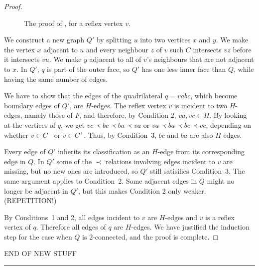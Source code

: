 \begin{proof}
  \begin{figure}
     \caption{The proof of , for a reflex
       vertex $v$.}
  \end{figure}
   


   We construct a new graph $Q'$ by splitting $u$ into two vertices $x$
   and $y$.  We make the vertex $x$ adjacent to $u$ and every neighbour
   $z$ of $v$ such $C$ intersects $vz$ before it intersects $vu$.  We make
   $y$ adjacent to all of $v$'s neighbours that are not adjacent to $x$.
   In $Q'$, $q$ is part of the outer face, so $Q'$ has one less inner
   face than $Q$, while having the same number of edges.

We have to show that the edges of the quadrilateral 
$q=vabc$,
which become boundary edges of $Q'$, are $H$-edges.
The reflex vertex $v$ is incident to two $H$-edges, namely those of
$F$, and therefore, by Condition 2, $va,vc\in H$.
By looking at the vertices of $q$, we get
$vc \prec bc\prec ba\prec va$ or 
$va \prec ba\prec bc\prec vc$,
 depending on whether $v\in C^-$ or
$v\in C^+$. 
Thus, by Condition~3, $bc$ and $ba$ are also $H$-edges.

Every edge of $Q'$ inherits its classification as an $H$-edge from
its corresponding edge in $Q$.
   In $Q'$ some of the $\prec$ relations involving edges incident
   to $v$ are missing, but no new ones are introduced, so $Q'$ still
   satisifies Condition~3.
The same argument applies to
Condition~2. Some adjacent edges in $Q$ might no longer be adjacent
in $Q'$, but this makes Condition 2 only weaker. (REPETITION!)


   By Conditions~1 and 2, all edges incident to $v$ are $H$-edges and $v$
   is a reflex vertex of $q$. Therefore all edges of $q$ are $H$-edges.
We have justified the induction step for the case when $Q$ is
2-connected, and
   the proof is complete.
\end{proof}


END OF NEW STUFF
\hrule


